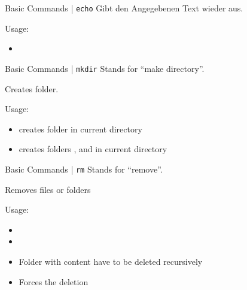 \documentclass{setbeamer}
\begin{document}
\begin{frame}{Basic Commands | \texttt{echo}}
    Gibt den Angegebenen Text wieder aus.

    \vspace{0.3cm}

    Usage:
    \begin{itemize}
        \item {}
    \end{itemize}
\end{frame}

\begin{frame}{Basic Commands | \texttt{mkdir}}
    Stands for ``make directory''.

    \vspace{0.3cm}

    Creates folder.

    \vspace{0.3cm}

    Usage:
    \begin{itemize}
        \item {}\textemdash creates folder  in current directory
        \item {}\textemdash creates folders ,  and  in current directory
    \end{itemize}
\end{frame}

\begin{frame}{Basic Commands | \texttt{rm}}
    Stands for ``remove''.

    \vspace{0.3cm}

    Removes files or folders

    \vspace{0.3cm}

    Usage:
    \begin{itemize}
        \item {}
        \item {}
        \item {}\textemdash Folder with content have to be deleted recursively
        \item {}\textemdash Forces the deletion
    \end{itemize}
\end{frame}
\end{document}
